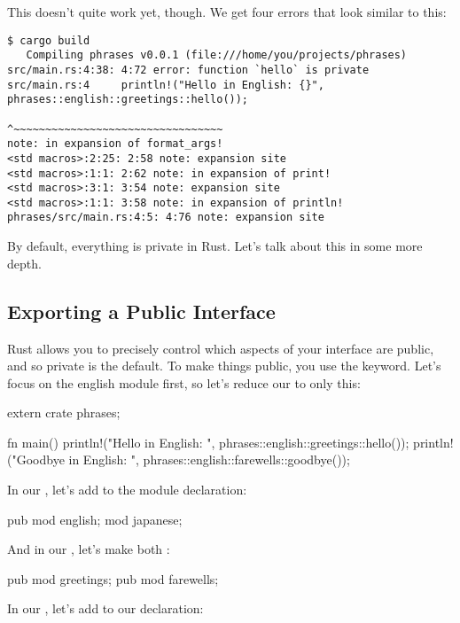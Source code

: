 \blank

This doesn't quite work yet, though. We get four errors that look similar to this:

\begin{verbatim}
$ cargo build
   Compiling phrases v0.0.1 (file:///home/you/projects/phrases)
src/main.rs:4:38: 4:72 error: function `hello` is private
src/main.rs:4     println!("Hello in English: {}", phrases::english::greetings::hello());
                                                   ^~~~~~~~~~~~~~~~~~~~~~~~~~~~~~~~~~
note: in expansion of format_args!
<std macros>:2:25: 2:58 note: expansion site
<std macros>:1:1: 2:62 note: in expansion of print!
<std macros>:3:1: 3:54 note: expansion site
<std macros>:1:1: 3:58 note: in expansion of println!
phrases/src/main.rs:4:5: 4:76 note: expansion site
\end{verbatim}

By default, everything is private in Rust. Let's talk about this in some more depth.

\subsection*{Exporting a Public Interface}

Rust allows you to precisely control which aspects of your interface are public, and so private is the default. To make things public, 
you use the  keyword. Let's focus on the english module first, so let's reduce our  to only this:

\begin{rustc}
extern crate phrases;

fn main() {
    println!("Hello in English: {}", phrases::english::greetings::hello());
    println!("Goodbye in English: {}", phrases::english::farewells::goodbye());
}
\end{rustc}

In our , let's add  to the  module declaration:

\begin{rustc}
pub mod english;
mod japanese;
\end{rustc}

And in our , let's make both :

\begin{rustc}
pub mod greetings;
pub mod farewells;
\end{rustc}

In our , let's add  to our  declaration:

